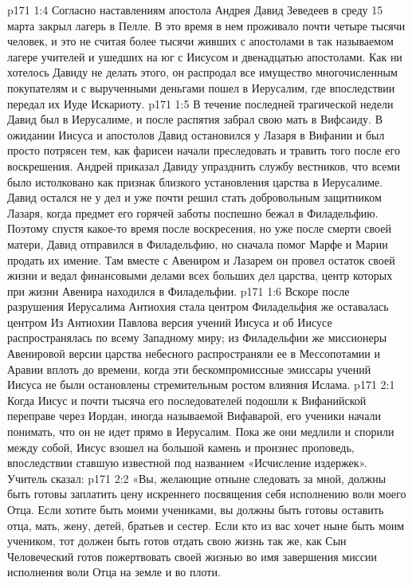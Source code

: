 \vs p171 1:4 Согласно наставлениям апостола Андрея Давид Зеведеев в среду 15 марта закрыл лагерь в Пелле. В это время в нем проживало почти четыре тысячи человек, и это не считая более тысячи живших с апостолами в так называемом лагере учителей и ушедших на юг с Иисусом и двенадцатью апостолами. Как ни хотелось Давиду не делать этого, он распродал все имущество многочисленным покупателям и с вырученными деньгами пошел в Иерусалим, где впоследствии передал их Иуде Искариоту.
\vs p171 1:5 \pc В течение последней трагической недели Давид был в Иерусалиме, и после распятия забрал свою мать в Вифсаиду. В ожидании Иисуса и апостолов Давид остановился у Лазаря в Вифании и был просто потрясен тем, как фарисеи начали преследовать и травить того после его воскрешения. Андрей приказал Давиду упразднить службу вестников, что всеми было истолковано как признак близкого установления царства в Иерусалиме. Давид остался не у дел и уже почти решил стать добровольным защитником Лазаря, когда предмет его горячей заботы поспешно бежал в Филадельфию. Поэтому спустя какое\hyp{}то время после воскресения, но уже после смерти своей матери, Давид отправился в Филадельфию, но сначала помог Марфе и Марии продать их имение. Там вместе с Авениром и Лазарем он провел остаток своей жизни и ведал финансовыми делами всех больших дел царства, центр которых при жизни Авенира находился в Филадельфии.
\vs p171 1:6 Вскоре после разрушения Иерусалима Антиохия стала центром  Филадельфия же оставалась центром  Из Антиохии Павлова версия учений Иисуса и об Иисусе распространялась по всему Западному миру; из Филадельфии же миссионеры Авенировой версии царства небесного распространяли ее в Мессопотамии и Аравии вплоть до времени, когда эти бескомпромиссные эмиссары учений Иисуса не были остановлены стремительным ростом влияния Ислама.
\vs p171 2:1 Когда Иисус и почти тысяча его последователей подошли к Вифанийской переправе через Иордан, иногда называемой Вифаварой, его ученики начали понимать, что он не идет прямо в Иерусалим. Пока же они медлили и спорили между собой, Иисус взошел на большой камень и произнес проповедь, впоследствии ставшую известной под названием «Исчисление издержек». Учитель сказал:
\vs p171 2:2 \pc «Вы, желающие отныне следовать за мной, должны быть готовы заплатить цену искреннего посвящения себя исполнению воли моего Отца. Если хотите быть моими учениками, вы должны быть готовы оставить отца, мать, жену, детей, братьев и сестер. Если кто из вас хочет ныне быть моим учеником, тот должен быть готов отдать свою жизнь так же, как Сын Человеческий готов пожертвовать своей жизнью во имя завершения миссии исполнения воли Отца на земле и во плоти.
